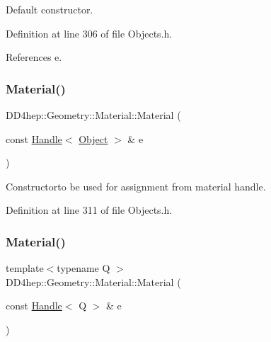 Default constructor. 



Definition at line 306 of file Objects.\+h.



References e.

\hypertarget{class_d_d4hep_1_1_geometry_1_1_material_a33fffc1be75fb353a8df0f982fb05269}{}\label{class_d_d4hep_1_1_geometry_1_1_material_a33fffc1be75fb353a8df0f982fb05269} 
\subsubsection{\texorpdfstring{Material()}{Material()}\hspace{0.1cm}{\footnotesize\ttfamily [2/3]}}
{\footnotesize\ttfamily D\+D4hep\+::\+Geometry\+::\+Material\+::\+Material (\begin{DoxyParamCaption}\item[{const \hyperlink{class_d_d4hep_1_1_handle}{Handle}$<$ \hyperlink{class_d_d4hep_1_1_geometry_1_1_material_afdf167b558006f1bf7348fa5e812f4d8}{Object} $>$ \&}]{e }\end{DoxyParamCaption})\hspace{0.3cm}{\ttfamily [inline]}}



Constructorto be used for assignment from material handle. 



Definition at line 311 of file Objects.\+h.

\hypertarget{class_d_d4hep_1_1_geometry_1_1_material_a83bacf08403036fbfb4e5eb32e60944a}{}\label{class_d_d4hep_1_1_geometry_1_1_material_a83bacf08403036fbfb4e5eb32e60944a} 
\subsubsection{\texorpdfstring{Material()}{Material()}\hspace{0.1cm}{\footnotesize\ttfamily [3/3]}}
{\footnotesize\ttfamily template$<$typename Q $>$ \\
D\+D4hep\+::\+Geometry\+::\+Material\+::\+Material (\begin{DoxyParamCaption}\item[{const \hyperlink{class_d_d4hep_1_1_handle}{Handle}$<$ Q $>$ \&}]{e }\end{DoxyParamCaption})\hspace{0.3cm}{\ttfamily [inline]}}




